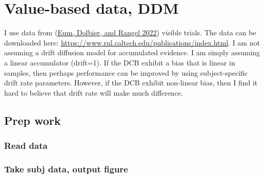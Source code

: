 \documentclass[
]{book}
\newenvironment{Shaded}{\begin{snugshade}}{\end{snugshade}}
\newcommand{\AttributeTok}[1]{\textcolor[rgb]{0.13,0.29,0.53}{#1}}
\newcommand{\CommentTok}[1]{\textcolor[rgb]{0.56,0.35,0.01}{\textit{#1}}}
\newcommand{\DecValTok}[1]{\textcolor[rgb]{0.00,0.00,0.81}{#1}}
\newcommand{\FunctionTok}[1]{\textcolor[rgb]{0.13,0.29,0.53}{\textbf{#1}}}
\newcommand{\NormalTok}[1]{#1}
\newcommand{\OtherTok}[1]{\textcolor[rgb]{0.56,0.35,0.01}{#1}}
\newcommand{\SpecialCharTok}[1]{\textcolor[rgb]{0.81,0.36,0.00}{\textbf{#1}}}
\newcommand{\StringTok}[1]{\textcolor[rgb]{0.31,0.60,0.02}{#1}}
\begin{document}
\hypertarget{value-based-data-ddm}{%
\section{Value-based data, DDM}\label{value-based-data-ddm}}

I use data from (\protect\hyperlink{ref-eum2022}{Eum, Dolbier, and Rangel 2022}) visible trials. The data can be downloaded here: \url{https://www.rnl.caltech.edu/publications/index.html}. I am not assuming a drift diffusion model for accumulated evidence. I am simply assuming a linear accumulator (drift=1). If the DCB exhibit a bias that is linear in samples, then perhaps performance can be improved by using subject-specific drift rate parameters. However, if the DCB exhibit non-linear bias, then I find it hard to believe that drift rate will make much difference.

\hypertarget{prep-work-2}{%
\subsection{Prep work}\label{prep-work-2}}

\hypertarget{read-data}{%
\subsubsection*{Read data}\label{read-data}}

\begin{Shaded}
\end{Shaded}

\hypertarget{take-subj-data-output-figure-1}{%
\subsubsection*{Take subj data, output figure}\label{take-subj-data-output-figure-1}}
\end{document}
